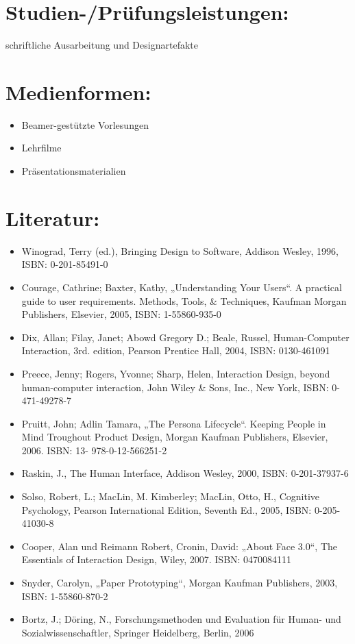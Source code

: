 \section*{Studien-/Prüfungsleistungen:}\label{studien-pruxfcfungsleistungen-5}

schriftliche Ausarbeitung und Designartefakte

\section*{Medienformen:}\label{medienformen-5}

\begin{itemize}
\tightlist
\item
  Beamer-gestützte Vorlesungen
\item
  Lehrfilme
\item
  Präsentationsmaterialien
\end{itemize}

\section*{Literatur:}\label{literatur-5}

\begin{itemize}
\tightlist
\item
  Winograd, Terry (ed.), Bringing Design to Software, Addison Wesley,
  1996, ISBN: 0-201-85491-0
\item
  Courage, Cathrine; Baxter, Kathy, „Understanding Your Users``. A
  practical guide to user requirements. Methods, Tools, \& Techniques,
  Kaufman Morgan Publishers, Elsevier, 2005, ISBN: 1-55860-935-0
\item
  Dix, Allan; Filay, Janet; Abowd Gregory D.; Beale, Russel,
  Human-Computer Interaction, 3rd. edition, Pearson Prentice Hall, 2004,
  ISBN: 0130-461091
\item
  Preece, Jenny; Rogers, Yvonne; Sharp, Helen, Interaction Design,
  beyond human-computer interaction, John Wiley \& Sons, Inc., New York,
  ISBN: 0-471-49278-7
\item
  Pruitt, John; Adlin Tamara, „The Persona Lifecycle``. Keeping People
  in Mind Troughout Product Design, Morgan Kaufman Publishers, Elsevier,
  2006. ISBN: 13- 978-0-12-566251-2
\item
  Raskin, J., The Human Interface, Addison Wesley, 2000, ISBN:
  0-201-37937-6
\item
  Solso, Robert, L.; MacLin, M. Kimberley; MacLin, Otto, H., Cognitive
  Psychology, Pearson International Edition, Seventh Ed., 2005, ISBN:
  0-205-41030-8
\item
  Cooper, Alan und Reimann Robert, Cronin, David: „About Face 3.0``, The
  Essentials of Interaction Design, Wiley, 2007. ISBN: 0470084111
\item
  Snyder, Carolyn, „Paper Prototyping``, Morgan Kaufman Publishers,
  2003, ISBN: 1-55860-870-2
\item
  Bortz, J.; Döring, N., Forschungsmethoden und Evaluation für Human-
  und Sozialwissenschaftler, Springer Heidelberg, Berlin, 2006
\end{itemize}

